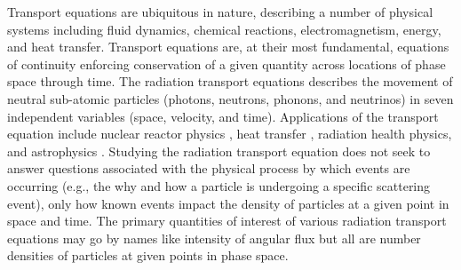 Transport equations are ubiquitous in nature, describing a number of physical systems including fluid dynamics, chemical reactions, electromagnetism, energy, and heat transfer.
Transport equations are, at their most fundamental, equations of continuity enforcing conservation of a given quantity across locations of phase space through time.
The radiation transport equations describes the movement of neutral sub-atomic particles (photons, neutrons, phonons, and neutrinos) in seven independent variables (space, velocity, and time).
Applications of the transport equation include nuclear reactor physics \cite{duderstadt_hamilton}, heat transfer \cite{radheattrans2003}, radiation health physics, and astrophysics \cite{chandrasekhar1960radiative}.
Studying the radiation transport equation does not seek to answer questions associated with the physical process by which events are occurring (e.g., the why and how a particle is undergoing a specific scattering event), only how known events impact the density of particles at a given point in space and time.
The primary quantities of interest of various radiation transport equations may go by names like intensity of angular flux but all are number densities of particles at given points in phase space.

